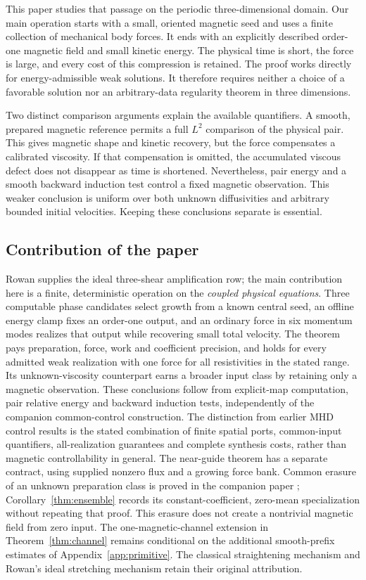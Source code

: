 \documentclass[11pt,a4paper]{amsart}
\theoremstyle{definition}
\theoremstyle{remark}
\numberwithin{equation}{section}
\begin{document}
This paper studies that passage on the periodic three-dimensional domain. Our main operation starts with a small, oriented magnetic seed and uses a finite collection of mechanical body forces. It ends with an explicitly described order-one magnetic field and small kinetic energy. The physical time is short, the force is large, and every cost of this compression is retained. The proof works directly for energy-admissible weak solutions. It therefore requires neither a choice of a favorable solution nor an arbitrary-data regularity theorem in three dimensions.

Two distinct comparison arguments explain the available quantifiers. A smooth, prepared magnetic reference permits a full $L^2$ comparison of the physical pair. This gives magnetic shape and kinetic recovery, but the force compensates a calibrated viscosity. If that compensation is omitted, the accumulated viscous defect does not disappear as time is shortened. Nevertheless, pair energy and a smooth backward induction test control a fixed magnetic observation. This weaker conclusion is uniform over both unknown diffusivities and arbitrary bounded initial velocities. Keeping these conclusions separate is essential.

\subsection{Contribution of the paper}
Rowan supplies the ideal three-shear amplification row; the main contribution here is a finite, deterministic operation on the \emph{coupled physical equations}. Three computable phase candidates select growth from a known central seed, an offline energy clamp fixes an order-one output, and an ordinary force in six momentum modes realizes that output while recovering small total velocity. The theorem pays preparation, force, work and coefficient precision, and holds for every admitted weak realization with one force for all resistivities in the stated range. Its unknown-viscosity counterpart earns a broader input class by retaining only a magnetic observation. These conclusions follow from explicit-map computation, pair relative energy and backward induction tests, independently of the companion common-control construction. The distinction from earlier MHD control results is the stated combination of finite spatial ports, common-input quantifiers, all-realization guarantees and complete synthesis costs, rather than magnetic controllability in general. The near-guide theorem has a separate contract, using supplied nonzero flux and a growing force bank. Common erasure of an unknown preparation class is proved in the companion paper \cite{CommonControl}; Corollary~\ref{thm:ensemble} records its constant-coefficient, zero-mean specialization without repeating that proof. This erasure does not create a nontrivial magnetic field from zero input. The one-magnetic-channel extension in Theorem~\ref{thm:channel} remains conditional on the additional smooth-prefix estimates of Appendix~\ref{app:primitive}. The classical straightening mechanism and Rowan's ideal stretching mechanism retain their original attribution.
\end{document}
